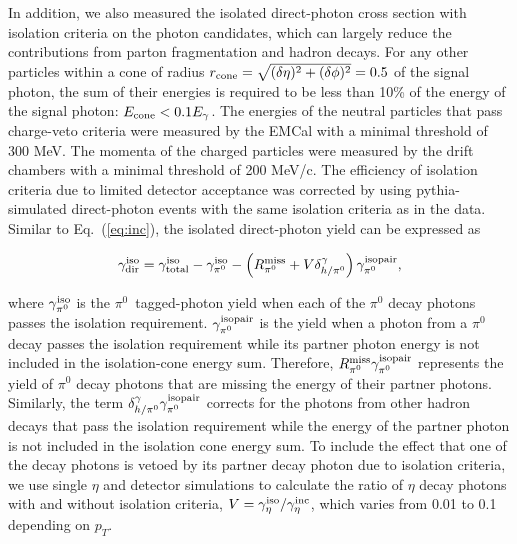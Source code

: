 \documentclass[twocolumn,letterpaper,aps,prl,longbibliography,superscriptaddress,floatfix]{revtex4-2}
\newcommand{\pT}{\mbox{$p_T$}\xspace}
\newcommand{\pizero}{\mbox{$\pi^0$}\xspace}
\begin{document}
In addition, we also measured the isolated direct-photon cross section 
with isolation criteria on the photon candidates, which can largely 
reduce the contributions from parton fragmentation and hadron decays. 
For any other particles within a cone of radius $r_{{\rm cone}} = 
\sqrt{(\delta\eta)^2 + (\delta\phi)^2} = 0.5$ of the signal photon, the 
sum of their energies is required to be less than 10\% of the energy of 
the signal photon: $E_{{\rm cone}} < 0.1 E_{\gamma}$. The energies of 
the neutral particles that pass charge-veto criteria were measured by 
the EMCal with a minimal threshold of 300 MeV. The momenta of the 
charged particles were measured by the drift chambers with a minimal 
threshold of 200 MeV/c. The efficiency of isolation criteria due to 
limited detector acceptance was corrected by using {\sc pythia}-simulated 
direct-photon events with the same isolation criteria as in the data. 
Similar to Eq.~(\ref{eq:inc}), the isolated direct-photon yield can be 
expressed as

\begin{equation} \label{eq:iso}
\gamma_{{\rm dir}}^{{\rm iso}} = \gamma_{{\rm total}}^{{\rm iso}} - \gamma_{\pi^0}^{{\rm iso}} - \left( R_{\pi^0}^{{\rm miss}} + V\delta_{h/\pi^0}^{\gamma} \right) \gamma_{\pi^0}^{{\rm isopair}},
\end{equation}

\noindent where $\gamma_{\pi^0}^{{\rm iso}}$ is the \pizero \ tagged-photon yield 
when each of the \pizero decay photons passes the isolation 
requirement. $\gamma_{\pi^0}^{{\rm isopair}}$ is the yield when a 
photon from a \pizero decay passes the isolation requirement while its 
partner photon energy is not included in the isolation-cone energy sum. 
Therefore, $R_{\pi^0}^{{\rm miss}}\gamma_{\pi^0}^{{\rm isopair}}$ 
represents the yield of \pizero decay photons that are missing the energy
of their partner photons. 
Similarly, the term $\delta_{h/\pi^0}^{\gamma}\gamma_{\pi^0}^{{\rm isopair}}$ 
corrects for the 
photons from other hadron decays that pass the isolation requirement 
while the energy of the partner photon is not included in the isolation cone 
energy sum.  To include the effect that one of the decay photons is 
vetoed by its partner decay photon due to isolation criteria, we use 
single $\eta$ and detector simulations to calculate the ratio of $\eta$ 
decay photons with and without isolation criteria, 
$V=\gamma^{{\rm iso}}_{\eta}/\gamma^{{\rm inc}}_{\eta}$, which varies 
from 0.01 to 0.1 depending on \pT.

\end{document}

